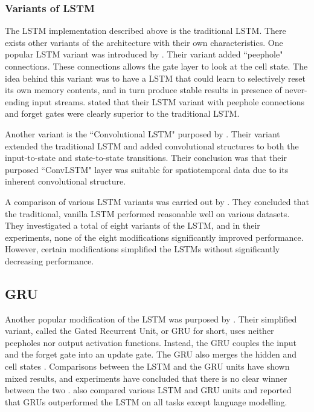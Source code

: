 \subsubsection{Variants of LSTM}
The LSTM implementation described above is the traditional LSTM. There exists other variants of the architecture with their own characteristics. One popular LSTM variant was introduced by \citep{gers2001lstm}. Their variant added ``peephole" connections. These connections allows the gate layer to look at the cell state. The idea behind this variant was to have a LSTM that could learn to selectively reset its own memory contents, and in turn produce stable results in presence of never-ending input streams. \citep{gers2001lstm} stated that their LSTM variant with peephole connections and forget gates were clearly superior to the traditional LSTM. 

Another variant is the ``Convolutional LSTM" purposed by \citep{xingjian2015convolutional}. Their variant extended the traditional LSTM and added convolutional structures to both the input-to-state and state-to-state transitions. Their conclusion was that their purposed ``ConvLSTM" layer was suitable for spatiotemporal data due to its inherent convolutional structure.

A comparison of various LSTM variants was carried out by \citep{greff2016lstm}. They concluded that the traditional, vanilla LSTM performed reasonable well on various datasets. They investigated a total of eight variants of the LSTM, and in their experiments, none of the eight modifications significantly improved performance. However, certain modifications simplified the LSTMs without significantly decreasing performance. 

\subsection{GRU}
Another popular modification of the LSTM was purposed by \citep{chung2014empirical}. Their simplified variant, called the Gated Recurrent Unit, or GRU for short, uses neither peepholes nor output activation functions. Instead, the GRU couples the input and the forget gate into an update gate. The GRU also merges the hidden and cell states  \citep{greff2016lstm, chung2014empirical}. Comparisons between the LSTM and the GRU units have shown mixed results, and experiments have concluded that there is no clear winner between the two \citep{greff2016lstm, chung2014empirical}. \cite{jozefowicz2015empirical} also compared various LSTM and GRU units and reported that GRUs outperformed the LSTM on all tasks except language modelling.

